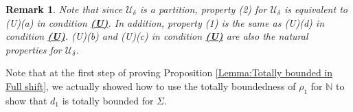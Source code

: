 \documentclass[11pt, reqno]{amsart}
\theoremstyle{plain}%
\newtheorem{remark}[theorem]{Remark}
\newtheorem{proposition}[theorem]{Proposition}
\theoremstyle{definition}
\theoremstyle{definition}
\def\N{\ensuremath{\mathbb N}}
\def\U{\ensuremath{\mathcal U}}
\def\st{such that }
\def\ulx{\underline{x}}
\numberwithin{equation}{section}
\begin{document}
\begin{remark}
Note that since $\U_{\delta}$ is a partition, property (2) for $\U_\delta$ is equivalent to (U)(a) in condition \hyperref[Condition (U)]{\textbf{(U)}}. In addition, property (1) is the same as (U)(d) in condition \hyperref[Condition (U)]{\textbf{(U)}}. (U)(b) and (U)(c) in condition \hyperref[Condition (U)]{\textbf{(U)}} are also the natural properties for $\U_{\delta}$.
\end{remark}

Note that at the first step of proving Proposition \ref{Lemma:Totally bounded in Full shift}, we actually showed how to use the totally boundedness of $\rho_1$ for $\N$ to show that $d_1$ is totally bounded for $\Sigma$.


    
\end{document}
